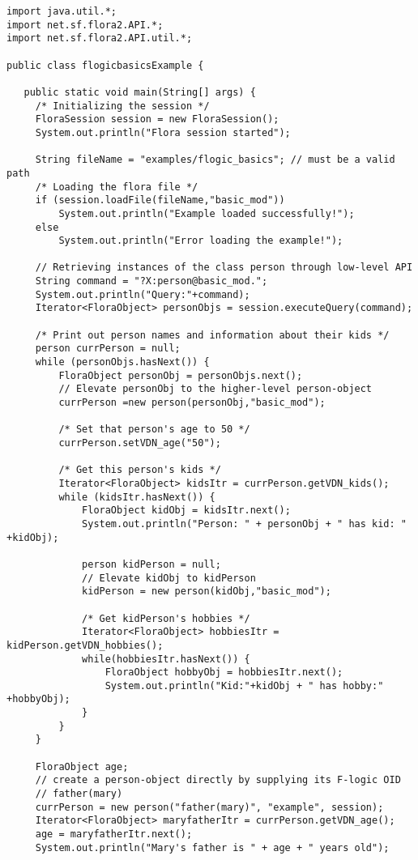 \begin{verbatim}
import java.util.*;
import net.sf.flora2.API.*;
import net.sf.flora2.API.util.*;

public class flogicbasicsExample {

   public static void main(String[] args) {
     /* Initializing the session */
     FloraSession session = new FloraSession();
     System.out.println("Flora session started");

     String fileName = "examples/flogic_basics"; // must be a valid path
     /* Loading the flora file */
     if (session.loadFile(fileName,"basic_mod"))
         System.out.println("Example loaded successfully!");
     else
         System.out.println("Error loading the example!");

     // Retrieving instances of the class person through low-level API
     String command = "?X:person@basic_mod.";
     System.out.println("Query:"+command);
     Iterator<FloraObject> personObjs = session.executeQuery(command);

     /* Print out person names and information about their kids */
     person currPerson = null;
     while (personObjs.hasNext()) {
         FloraObject personObj = personObjs.next();
         // Elevate personObj to the higher-level person-object
         currPerson =new person(personObj,"basic_mod");

         /* Set that person's age to 50 */
         currPerson.setVDN_age("50");

         /* Get this person's kids */
         Iterator<FloraObject> kidsItr = currPerson.getVDN_kids();
         while (kidsItr.hasNext()) {
             FloraObject kidObj = kidsItr.next();
             System.out.println("Person: " + personObj + " has kid: " +kidObj);

             person kidPerson = null;
             // Elevate kidObj to kidPerson
             kidPerson = new person(kidObj,"basic_mod");

             /* Get kidPerson's hobbies */
             Iterator<FloraObject> hobbiesItr = kidPerson.getVDN_hobbies();
             while(hobbiesItr.hasNext()) {
                 FloraObject hobbyObj = hobbiesItr.next();
                 System.out.println("Kid:"+kidObj + " has hobby:" +hobbyObj);
             }
         }
     }

     FloraObject age;
     // create a person-object directly by supplying its F-logic OID
     // father(mary)
     currPerson = new person("father(mary)", "example", session);
     Iterator<FloraObject> maryfatherItr = currPerson.getVDN_age();
     age = maryfatherItr.next();
     System.out.println("Mary's father is " + age + " years old");


\end{verbatim}
